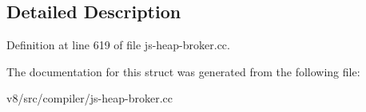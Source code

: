 \subsection{Detailed Description}


Definition at line 619 of file js-\/heap-\/broker.\+cc.



The documentation for this struct was generated from the following file\+:\begin{DoxyCompactItemize}
\item 
v8/src/compiler/js-\/heap-\/broker.\+cc\end{DoxyCompactItemize}
